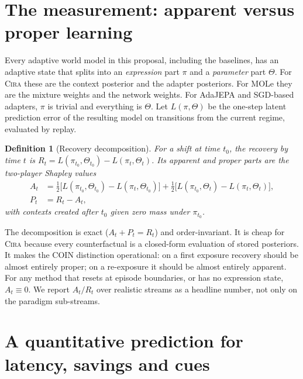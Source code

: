 \documentclass[10pt]{article}
\newtheorem{definition}{Definition}
\newcommand{\method}{\textsc{Cira}}
\begin{document}
\section{The measurement: apparent versus proper learning}

Every adaptive world model in this proposal, including the baselines, has an adaptive state that
splits into an \emph{expression} part $\pi$ and a \emph{parameter} part $\Theta$. For \method{} these
are the context posterior and the adapter posteriors. For MOLe they are the mixture weights and the
network weights. For AdaJEPA and SGD-based adapters, $\pi$ is trivial and everything is $\Theta$. Let
$L(\pi,\Theta)$ be the one-step latent prediction error of the resulting model on transitions from the
current regime, evaluated by replay.

\begin{definition}[Recovery decomposition]\label{def:decomp}
For a shift at time $t_0$, the recovery by time $t$ is
$R_t=L(\pi_{t_0},\Theta_{t_0})-L(\pi_t,\Theta_t)$. Its apparent and proper parts are the two-player
Shapley values
\begin{align*}
  A_t &= \tfrac12\big[L(\pi_{t_0},\Theta_{t_0})-L(\pi_t,\Theta_{t_0})\big]
        +\tfrac12\big[L(\pi_{t_0},\Theta_t)-L(\pi_t,\Theta_t)\big],\\
  P_t &= R_t-A_t,
\end{align*}
with contexts created after $t_0$ given zero mass under $\pi_{t_0}$.
\end{definition}

The decomposition is exact ($A_t+P_t=R_t$) and order-invariant. It is cheap for \method{} because every
counterfactual is a closed-form evaluation of stored posteriors. It makes the COIN distinction
operational: on a first exposure recovery should be almost entirely proper; on a re-exposure it should
be almost entirely apparent. For any method that resets at episode boundaries, or has no expression
state, $A_t\equiv 0$. We report $A_t/R_t$ over realistic streams as a headline number, not only on the
paradigm sub-streams.

\section{A quantitative prediction for latency, savings and cues}
\end{document}
